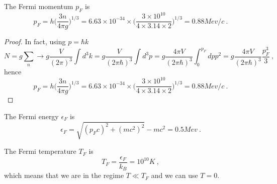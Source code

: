     The Fermi momentum $p_F$ is 
    \begin{equation*}
        p_F = h \Big ( \frac{3 n}{4 \pi g} \Big)^{1/3} = 6.63 \times 10^{-34}  \times \Big ( \frac{3 \times 10^{10}}{4 \times 3.14 \times 2} \Big)^{1/3} = 0.88 Mev/c ~.
    \end{equation*}
    \begin{proof}
        In fact, using $p = \hbar k$
        \begin{equation*}
            N = g \sum_{n} \rightarrow g \frac{V}{(2\pi)^3} \int d^3 k = g \frac{V}{(2\pi \hbar)^3} \int d^3 p = g \frac{4 \pi V}{(2\pi \hbar)^3} \int_0^{p_F} dp p^2 = g \frac{4 \pi V}{(2\pi \hbar)^3} \frac{p_F^3}{3} ~,
        \end{equation*}
        hence 
        \begin{equation*}
            p_F = h \Big ( \frac{3 n}{4 \pi g} \Big)^{1/3} = 6.63 \times 10^{-34}  \times \Big ( \frac{3 \times 10^{10}}{4 \times 3.14 \times 2} \Big)^{1/3} = 0.88 Mev/c ~.
        \end{equation*}
    \end{proof}

    The Fermi energy $\epsilon_F$ is 
    \begin{equation*}
        \epsilon_F = \sqrt{(p_F c)^2 + (mc^2)^2} - mc^2 = 0.5 Mev ~.
    \end{equation*}

    The Fermi temperature $T_F$ is 
    \begin{equation*}
        T_F = \frac{\epsilon_F}{k_B} = 10^{10} K ~,
    \end{equation*}
    which means that we are in the regime $T \ll T_F$ and we can use $T=0$.

